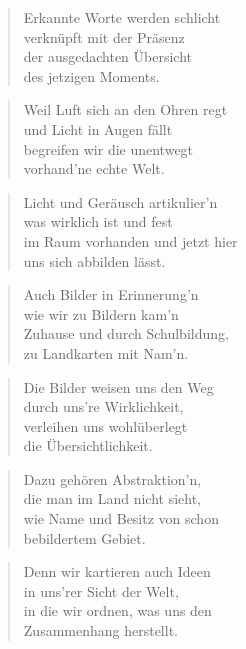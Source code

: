 \documentclass[10pt,a4paper]{article}
\begin{document}
\begin{multicols}{2}
\begin{verse}
Erkannte Worte werden schlicht \\
verknüpft mit der Präsenz \\
der ausgedachten Übersicht \\
des jetzigen Moments. \\
\end{verse}

\begin{verse}
Weil Luft sich an den Ohren regt \\
und Licht in Augen fällt \\
begreifen wir die unentwegt \\
vorhand’ne echte Welt. \\
\end{verse}

\begin{verse}
Licht und Geräusch artikulier’n \\
was wirklich ist und fest \\
im Raum vorhanden und jetzt hier \\
uns sich abbilden lässt. \\
\end{verse}

\begin{verse}
Auch Bilder in Erinnerung’n \\
wie wir zu Bildern kam’n \\
Zuhause und durch Schulbildung, \\
zu Landkarten mit Nam’n. \\
\end{verse}

\begin{verse}
Die Bilder weisen uns den Weg \\
durch uns’re Wirklichkeit, \\
verleihen uns wohlüberlegt \\
die Übersichtlichkeit. \\
\end{verse}

\begin{verse}
Dazu gehören Abstraktion’n, \\
die man im Land nicht sieht, \\
wie Name und Besitz von schon \\
bebildertem Gebiet. \\
\end{verse}

\begin{verse}
Denn wir kartieren auch Ideen \\
in uns’rer Sicht der Welt, \\
in die wir ordnen, was uns den \\
Zusammenhang herstellt. \\
\end{verse}


\end{multicols}
\end{document}
